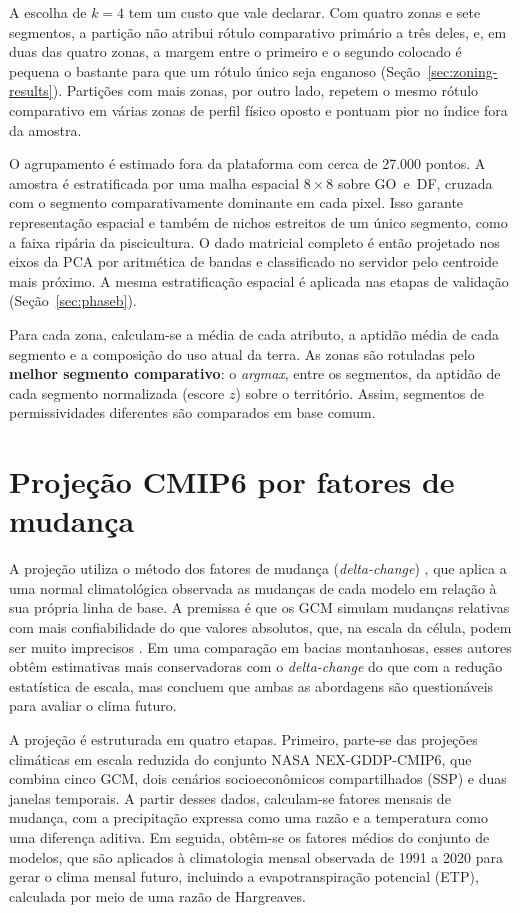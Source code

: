 A escolha de $k=4$ tem um custo que vale declarar. Com quatro zonas e sete segmentos, a partição
não atribui rótulo comparativo primário a três deles, e, em duas das quatro zonas, a margem entre o
primeiro e o segundo colocado é pequena o bastante para que um rótulo único seja enganoso
(Seção~\ref{sec:zoning-results}). Partições com mais zonas, por outro lado, repetem o mesmo rótulo
comparativo em várias zonas de perfil físico oposto e pontuam pior no índice fora da amostra.

O agrupamento é estimado fora da plataforma com cerca de 27.000 pontos. A amostra
é estratificada por uma malha espacial $8\times8$ sobre GO~e~DF, cruzada com o segmento
comparativamente dominante em cada pixel. Isso garante representação espacial e também de nichos
estreitos de um único segmento, como a faixa ripária da piscicultura. O dado matricial completo é então
projetado nos eixos da PCA por aritmética de bandas e classificado no servidor pelo centroide mais
próximo. A mesma estratificação espacial é aplicada nas etapas de validação (Seção~\ref{sec:phaseb}).

Para cada zona, calculam-se a média de cada atributo, a aptidão
média de cada segmento e a composição do uso atual da terra. As zonas são rotuladas pelo
\textbf{melhor segmento comparativo}: o \emph{argmax}, entre os segmentos, da aptidão de cada
segmento normalizada (escore $z$) sobre o território. Assim, segmentos de permissividades
diferentes são comparados em base comum.

\section{Projeção CMIP6 por fatores de mudança}\label{sec:cmip6}

A projeção utiliza o método dos fatores de mudança (\emph{delta-change})
\citep[p.~3]{ramirez-villegas_downscaling_2010}, que aplica a uma normal climatológica observada as
mudanças de cada modelo em relação à sua própria linha de base.
A premissa é que os GCM simulam mudanças relativas com mais confiabilidade do que valores absolutos,
que, na escala da célula, podem ser muito imprecisos \citep[pp.~387, 396]{hay_comparison_2000}. Em uma
comparação em bacias montanhosas, esses autores obtêm estimativas mais conservadoras com o
\emph{delta-change} do que com a redução estatística de escala, mas concluem que ambas as abordagens
são questionáveis para avaliar o clima futuro.

A projeção é estruturada em quatro etapas. Primeiro, parte-se das projeções climáticas em escala
reduzida do conjunto NASA NEX-GDDP-CMIP6, que combina cinco GCM, dois cenários socioeconômicos
compartilhados (SSP) e duas janelas temporais. A partir desses dados, calculam-se fatores mensais de
mudança, com a precipitação expressa como uma razão e a temperatura como uma diferença aditiva. Em
seguida, obtêm-se os fatores médios do conjunto de modelos, que são aplicados à climatologia mensal
observada de 1991 a 2020 para gerar o clima mensal futuro, incluindo a evapotranspiração potencial
(ETP), calculada por meio de uma razão de Hargreaves.

